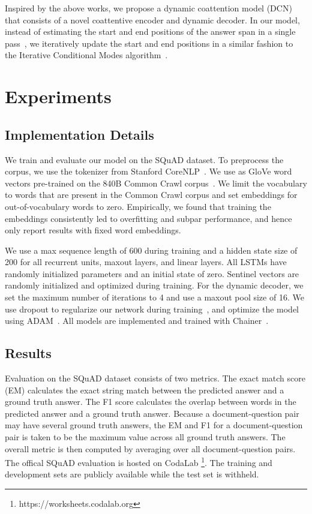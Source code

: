 \documentclass{article} \usepackage{iclr2017_conference,times}
\newcommand{\ours}{DCN\xspace}
\begin{document}
Inspired by the above works, we propose a dynamic coattention model (\ours) that consists of a novel coattentive encoder and dynamic decoder. In our model, instead of estimating the start and end positions of the answer span in a single pass~\citep{wang2016machine}, we iteratively update the start and end positions in a similar fashion to the Iterative Conditional Modes algorithm~\citep{besag1986statistical}.



\section{Experiments}

\subsection{Implementation Details}
\label{sec:implementation}

We train and evaluate our model on the SQuAD dataset.
To preprocess the corpus, we use the tokenizer from Stanford CoreNLP~\citep{manning2014stanford}.
We use as GloVe word vectors pre-trained on the 840B Common Crawl corpus~\citep{pennington2014glove}.
We limit the vocabulary to words that are present in the Common Crawl corpus and set embeddings for out-of-vocabulary words to zero. 
Empirically, we found that training the embeddings consistently led to overfitting and subpar performance, and hence only report results with fixed word embeddings.

We use a max sequence length of 600 during training and a hidden state size of 200 for all recurrent units, maxout layers, and linear layers.
All LSTMs have randomly initialized parameters and an initial state of zero.
Sentinel vectors are randomly initialized and optimized during training.
For the dynamic decoder, we set the maximum number of iterations to 4 and use a maxout pool size of 16.
We use dropout to regularize our network during training~\citep{srivastava2014dropout},
and optimize the model using ADAM~\citep{kingma2014adam}.
All models are implemented and trained with Chainer~\citep{tokui2015chainer}.



\subsection{Results}

Evaluation on the SQuAD dataset consists of two metrics. The exact match score (EM) calculates the exact string match between the predicted answer and a ground truth answer. The F1 score calculates the overlap between words in the predicted answer and a ground truth answer.
Because a document-question pair may have several ground truth answers, the EM and F1 for a document-question pair is taken to be the maximum value across all ground truth answers.
The overall metric is then computed by averaging over all document-question pairs.
The offical SQuAD evaluation is hosted on CodaLab
\footnote{https://worksheets.codalab.org}.
The training and development sets are publicly available while the test set is withheld.
\end{document}
